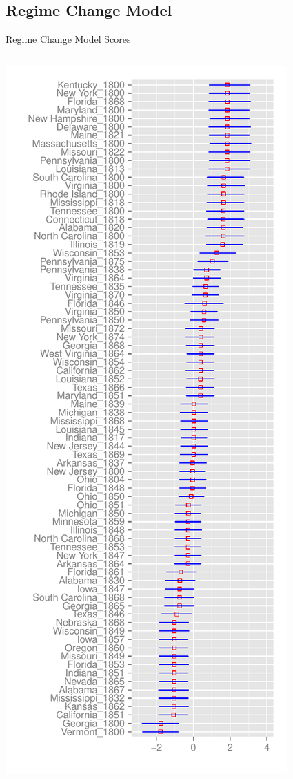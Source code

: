 \documentclass[compress]{beamer}
\makeatletter
\newcounter{acolumn}%
\let\column\@acolumn
\let\column\@@acolumn
\makeatother
\begin{document}
\subsection{Regime Change Model}
\begin{frame}{Regime Change Model Scores}
	\begin{columns}[c]
		\column{1.5in}
		\begin{center}
			\includegraphics[scale=.3]{graphics/regime/regime_param_mean_first_ggplot}

\end{center}
\end{columns}
\end{frame}
\end{document}
